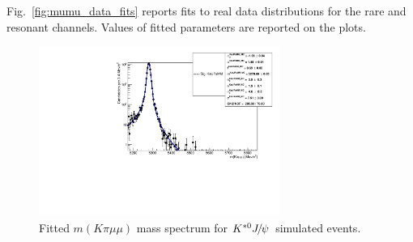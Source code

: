 Fig.~\ref{fig:mumu_data_fits} reports fits to real data distributions for the rare and resonant
\mumu channels. Values of fitted parameters are reported on the plots.
%
\begin{figure}[h!]
\centering \includegraphics[width=0.7\textwidth]{RKst/figs/fit_MMs_0_MM-q2central-gmc/KstJPsMM_MC_log.pdf}
\caption{Fitted $m(K\pi \mu\mu)$ mass spectrum for $\Kstarz\jpsi$ simulated events. }
\label{fig:mumu_MC_fits}
\end{figure}
%
